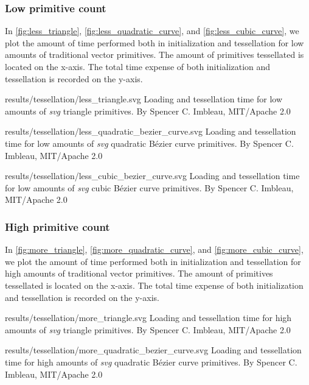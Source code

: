 \subsubsection{Low primitive count}
In \cref{fig:less_triangle}, \cref{fig:less_quadratic_curve}, and \cref{fig:less_cubic_curve}, we plot the amount of time performed both in initialization and tessellation for low amounts of traditional vector primitives. The amount of primitives tessellated is located on the x-axis. The total time expense of both initialization and tessellation is recorded on the y-axis.\medskip

\widesvg
{results/tessellation/less_triangle.svg}
{Loading and tessellation time for low amounts of \textit{svg} triangle primitives.\label{fig:less_triangle}}
{By Spencer C. Imbleau, MIT/Apache 2.0}\medskip

\widesvg
{results/tessellation/less_quadratic_bezier_curve.svg}
{Loading and tessellation time for low amounts of \textit{svg} quadratic Bézier curve primitives.\label{fig:less_quadratic_curve}}
{By Spencer C. Imbleau, MIT/Apache 2.0}\medskip

\widesvg
{results/tessellation/less_cubic_bezier_curve.svg}
{Loading and tessellation time for low amounts of \textit{svg} cubic Bézier curve primitives.\label{fig:less_cubic_curve}}
{By Spencer C. Imbleau, MIT/Apache 2.0}


\subsubsection{High primitive count}
In \cref{fig:more_triangle}, \cref{fig:more_quadratic_curve}, and \cref{fig:more_cubic_curve}, we plot the amount of time performed both in initialization and tessellation for high amounts of traditional vector primitives. The amount of primitives tessellated is located on the x-axis. The total time expense of both initialization and tessellation is recorded on the y-axis.\medskip

\widesvg
{results/tessellation/more_triangle.svg}
{Loading and tessellation time for high amounts of \textit{svg} triangle primitives.\label{fig:more_triangle}}
{By Spencer C. Imbleau, MIT/Apache 2.0}\medskip

\widesvg
{results/tessellation/more_quadratic_bezier_curve.svg}
{Loading and tessellation time for high amounts of \textit{svg} quadratic Bézier curve primitives.\label{fig:more_quadratic_curve}}
{By Spencer C. Imbleau, MIT/Apache 2.0}\medskip

